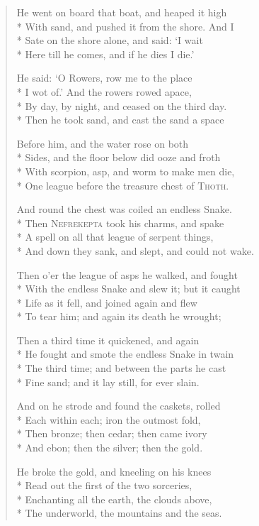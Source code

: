 \documentclass[12pt]{article}
\newcommand{\vin}{\hspace{1em}}
\begin{document}
\begin{verse}
He went on board that boat, and heaped it high\\*
With sand, and pushed it from the shore. And I\\*
\vin Sate on the shore alone, and said: `I wait\\*
Here till he comes, and if he dies I die.'

He said: `O Rowers, row me to the place\\*
I wot of.' And the rowers rowed apace,\\*
\vin By day, by night, and ceased on the third day.\\*
Then he took sand, and cast the sand a space

Before him, and the water rose on both\\*
Sides, and the floor below did ooze and froth\\*
\vin With scorpion, asp, and worm to make men die,\\*
One league before the treasure chest of \textsc{Thoth}.

And round the chest was coiled an endless Snake.\\*
Then \textsc{Nefrekepta} took his charms, and spake\\*
\vin A spell on all that league of serpent things,\\*
And down they sank, and slept, and could not wake.

Then o'er the league of asps he walked, and fought\\*
With the endless Snake and slew it; but it caught\\*
\vin Life as it fell, and joined again and flew\\*
To tear him; and again its death he wrought;

Then a third time it quickened, and again\\*
He fought and smote the endless Snake in twain\\*
\vin The third time; and between the parts he cast\\*
Fine sand; and it lay still, for ever slain.

And on he strode and found the caskets, rolled\\*
Each within each; iron the outmost fold,\\*
\vin Then bronze; then cedar; then came ivory\\*
And ebon; then the silver; then the gold.

He broke the gold, and kneeling on his knees\\*
Read out the first of the two sorceries,\\*
\vin Enchanting all the earth, the clouds above,\\*
The underworld, the mountains and the seas.


\end{verse}
\end{document}
